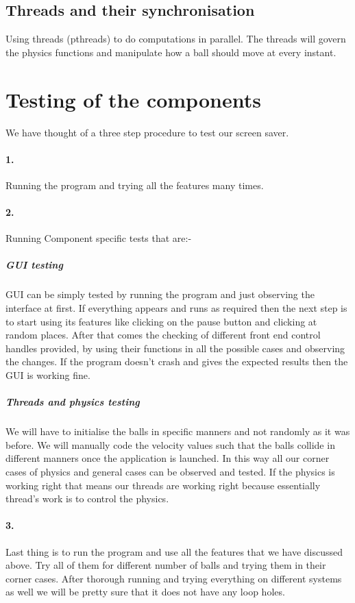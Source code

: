 \documentclass{article}
\begin{document}
	\subsection{Threads and their synchronisation}
	Using threads (pthreads) to do computations in parallel. The threads will govern the physics functions and manipulate how a ball should move at every instant.
	
	
	\section{Testing of the components}
	We have thought of a three step procedure to test our screen saver.
	\paragraph{1.}
		Running the program and trying all the features many times.
	\paragraph{2.}
		Running Component specific tests that are:-
		\subparagraph{GUI testing}
		GUI can be simply tested by running the program and just observing the interface at first. If everything appears and runs as required then the next step is to start using its features like clicking on the pause button and clicking at random places. After that comes the checking of different front end control handles provided, by using their functions in all the possible cases and observing the changes. If the program doesn't crash and gives the expected results then the GUI is working fine.

		\subparagraph{Threads and physics testing}
		We will have to initialise the balls in specific manners and not randomly as it was before. We will manually code the velocity values such that the balls collide in different manners once the application is launched. In this way all our corner cases of physics and general cases can be observed and tested. If the physics is working right that means our threads are working right because essentially thread's work is to control the physics.
	\paragraph{3.}
	Last thing is to run the program and use all the features that we have discussed above. Try all of them for different number of balls and trying them in their corner cases. After thorough running and trying everything on different systems as well we will be pretty sure that it does not have any loop holes.
\end{document}
